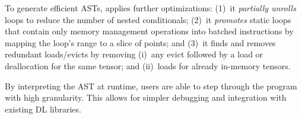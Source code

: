To generate efficient ASTs, \sys applies further optimizations: (1)~it \emph{partially unrolls} loops to reduce the number of nested conditionals; (2)~it \emph{promotes} static loops that contain only memory management operations into batched instructions by mapping the loop's range to a slice of points; and (3)~it finds and removes redundant loads/evicts by removing (i)~any evict followed by a load or deallocation for the same tensor; and (ii)~loads for already in-memory tensors. %


By interpreting the AST at runtime, users are able to step through the program with high granularity. This allows for simpler debugging and integration with existing DL libraries.%

